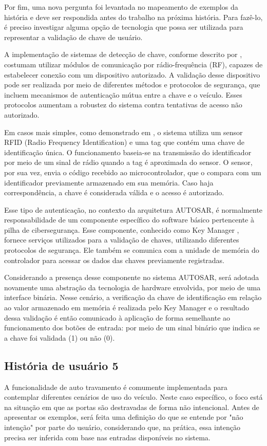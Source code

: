 Por fim, uma nova pergunta foi levantada no mapeamento de exemplos da história e deve ser respondida antes do trabalho na próxima história. Para fazê-lo, é 
preciso investigar alguma opção de tecnologia que possa ser utilizada para representar a validação de chave de usuário. 

A implementação de sistemas de detecção de chave, conforme descrito por \cite{glocker2016protocol}, costumam utilizar módulos de comunicação por rádio-frequência (RF), 
capazes de estabelecer conexão com um dispositivo autorizado. A validação desse dispositivo pode ser realizada por meio de diferentes métodos e protocolos de segurança, 
que incluem mecanismos de autenticação mútua entre a chave e o veículo. Esses protocolos aumentam a robustez do sistema contra tentativas de acesso não autorizado.

Em casos mais simples, como demonstrado em \cite{arduinoRFID}, o sistema utiliza um sensor RFID (Radio Frequency Identification) e uma tag que contém uma chave 
de identificação única. O funcionamento baseia-se na transmissão do identificador por meio de um sinal de rádio quando a tag é aproximada do sensor. O sensor, 
por sua vez, envia o código recebido ao microcontrolador, que o compara com um identificador previamente armazenado em sua memória. Caso haja correspondência, 
a chave é considerada válida e o acesso é autorizado.

Esse tipo de autenticação, no contexto da arquitetura AUTOSAR, é normalmente responsabilidade de um componente específico do software básico pertencente 
à pilha de cibersegurança. Esse componente, conhecido como Key Manager \cite{autosarKeyManager}, fornece serviços utilizados para a validação de chaves, 
utilizando diferentes protocolos de segurança. Ele também se comunica com a unidade de memória do controlador para acessar os dados das chaves previamente registradas.

Considerando a presença desse componente no sistema AUTOSAR, será adotada novamente uma abstração da tecnologia de hardware envolvida, por meio de uma interface 
binária. Nesse cenário, a verificação da chave de identificação em relação ao valor armazenado em memória é realizada pelo Key Manager e o resultado dessa 
validação é então comunicado à aplicação de forma semelhante ao funcionamento dos botões de entrada: por meio de um sinal binário que indica se a chave foi 
validada (1) ou não (0).

\subsection{História de usuário 5}
A funcionalidade de auto travamento é comumente implementada para contemplar diferentes cenários de uso do veículo. Neste caso específico, o foco está na situação em 
que as portas são destravadas de forma não intencional. Antes de apresentar os exemplos, será feita uma definição do que se entende por "não intenção" por parte do 
usuário, considerando que, na prática, essa intenção precisa ser inferida com base nas entradas disponíveis no sistema. 

